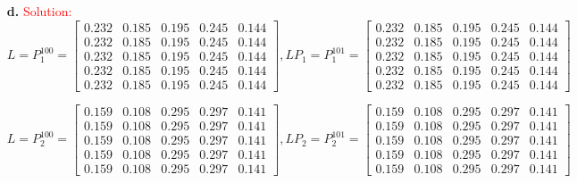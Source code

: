 \documentclass[11pt]{article} %
\begin{document}
\begin{itemize}
  \item[\textbf{d.}]  
\textcolor{red}{Solution:}
    $$
    L=P_1^100 = \begin{bmatrix}
      0.232 & 0.185 & 0.195 & 0.245 & 0.144 \\
      0.232 & 0.185 & 0.195 & 0.245 & 0.144 \\
      0.232 & 0.185 & 0.195 & 0.245 & 0.144 \\
      0.232 & 0.185 & 0.195 & 0.245 & 0.144 \\
     0.232 & 0.185 & 0.195 & 0.245 & 0.144  
    \end{bmatrix},
   LP_1=P_1^101 = \begin{bmatrix}
      0.232 & 0.185 & 0.195 & 0.245 & 0.144 \\
      0.232 & 0.185 & 0.195 & 0.245 & 0.144 \\
      0.232 & 0.185 & 0.195 & 0.245 & 0.144 \\
      0.232 & 0.185 & 0.195 & 0.245 & 0.144 \\
     0.232 & 0.185 & 0.195 & 0.245 & 0.144 
    \end{bmatrix} 
    $$

    $$
    L=P_2^100 = \begin{bmatrix}
      0.159  &  0.108  &  0.295  &  0.297  &  0.141 \\
      0.159  &  0.108  &  0.295  &  0.297  &  0.141 \\
      0.159  &  0.108  &  0.295  &  0.297  &  0.141 \\
      0.159  &  0.108  &  0.295  &  0.297  &  0.141 \\
      0.159  &  0.108  &  0.295  &  0.297  &  0.141 
    \end{bmatrix},
   LP_2=P_2^101 = \begin{bmatrix}
      0.159  &  0.108  &  0.295  &  0.297  &  0.141 \\
      0.159  &  0.108  &  0.295  &  0.297  &  0.141 \\
      0.159  &  0.108  &  0.295  &  0.297  &  0.141 \\
      0.159  &  0.108  &  0.295  &  0.297  &  0.141 \\
      0.159  &  0.108  &  0.295  &  0.297  &  0.141 
    \end{bmatrix}
    $$


\end{itemize}
\end{document}
